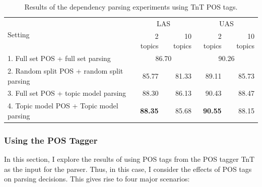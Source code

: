 

\begin{table}[t!]
	\centering
	\begin{tabular}{l|rr|rr}
		\multicolumn{1}{l|}{\multirow{2}{*}{Setting}} & \multicolumn{2}{c|}{LAS} & \multicolumn{2}{c}{UAS} \\
		\multicolumn{1}{c|}{} & 2 topics & 10 topics & 2 topics & 10 topics \\ \hline
		1. Full set POS + full set parsing & \multicolumn{2}{c|}{86.70} & \multicolumn{2}{c}{90.26} \\ 
		2. Random split POS + random split parsing & 85.77 & 81.33 & 89.11 & 85.73 \\ 
		3. Full set POS + topic model parsing & 88.30 & 86.13 & 90.43 & 88.47 \\ 
		4. Topic model POS + Topic model parsing & \textbf{88.35} & 85.68 & \textbf{90.55} & 88.15 \\ 
		\hline
	\end{tabular}
	\caption{Results of the dependency parsing experiments using TnT POS tags.}
	\label{tab:TnTPOS}
\end{table}



\subsubsection*{Using the POS Tagger}\label{TnTPOSinParsing}

In this section, I explore the results of using POS tags from the POS tagger TnT as the input for the parser. Thus, in this case, I consider the effects of POS tags on parsing decisions. This gives rise to four major scenarios:

